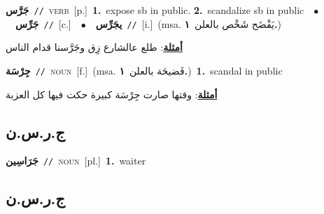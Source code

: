 \documentclass[10pt,a4paper,twoside]{article} %
\begin{document}
\begin{multicols}{2}
{\setlength\topsep{0pt}\textbf{\foreignlanguage{arabic}{جَرَّس}}\ {\color{gray}\texttt{//}\color{black}}\ \textsc{verb}\ [p.]\ \textbf{1.}~expose sb in public.  \textbf{2.}~scandalize sb in public\ \ $\bullet$\ \ \setlength\topsep{0pt}\textbf{\foreignlanguage{arabic}{جَرِّس}}\ {\color{gray}\texttt{//}\color{black}}\ [c.]\ \ $\bullet$\ \ \setlength\topsep{0pt}\textbf{\foreignlanguage{arabic}{يجَرِّس}}\ {\color{gray}\texttt{//}\color{black}}\ [i.]\ \color{gray}(msa. \foreignlanguage{arabic}{يَفْضَح شَخْص بالعلن}~\foreignlanguage{arabic}{\textbf{١.}})\color{black}\  \begin{flushright}\color{gray}\foreignlanguage{arabic}{\textbf{\underline{\foreignlanguage{arabic}{أمثلة}}}: طلع عالشارع زِق وجَرَّسنا قدام الناس}\end{flushright}\color{black}} \vspace{2mm}

{\setlength\topsep{0pt}\textbf{\foreignlanguage{arabic}{جِرْسَة}}\ {\color{gray}\texttt{//}\color{black}}\ \textsc{noun}\ [f.]\ \color{gray}(msa. \foreignlanguage{arabic}{فَضيحَة بالعلن}~\foreignlanguage{arabic}{\textbf{١.}})\color{black}\ \textbf{1.}~scandal in public\  \begin{flushright}\color{gray}\foreignlanguage{arabic}{\textbf{\underline{\foreignlanguage{arabic}{أمثلة}}}: وقتها صارت جِرْسَة كبيرة حكت فيها كل العزبة}\end{flushright}\color{black}} \vspace{2mm}

\vspace{-3mm}
\subsection*{\color{blue}\foreignlanguage{arabic}{ج.ر.س.ن}\color{blue}{}} 

{\setlength\topsep{0pt}\textbf{\foreignlanguage{arabic}{جَرَاسِين}}\ {\color{gray}\texttt{//}\color{black}}\ \textsc{noun}\ [pl.]\ \textbf{1.}~waiter\ } \vspace{2mm}

\vspace{-3mm}
\subsection*{\color{blue}\foreignlanguage{arabic}{ج.ر.س.ن}\color{blue}{ (ntws)}} 


\end{multicols}
\end{document}
